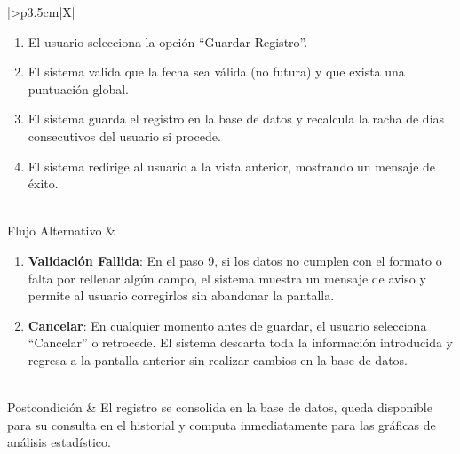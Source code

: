 \begin{xltabular}{\textwidth}{|>{\bfseries}p{3.5cm}|X|}
\begin{enumerate}[leftmargin=0.5cm, topsep=0pt, partopsep=0pt, parsep=0pt, itemsep=4pt]
        \item El usuario selecciona la opción ``Guardar Registro''.
        \item El sistema valida que la fecha sea válida (no futura) y que exista una puntuación global.
        \item El sistema guarda el registro en la base de datos y recalcula la racha de días consecutivos del usuario si procede.
        \item El sistema redirige al usuario a la vista anterior, mostrando un mensaje de éxito.
    \end{enumerate} 
    \\ \hline
    Flujo Alternativo & 
    \begin{enumerate}[leftmargin=0.5cm, topsep=0pt, partopsep=0pt, parsep=0pt, itemsep=4pt]
        \item \textbf{Validación Fallida}: En el paso 9, si los datos no cumplen con el formato o falta por rellenar algún campo, el sistema muestra un mensaje de aviso y permite al usuario corregirlos sin abandonar la pantalla.
        \item \textbf{Cancelar}: En cualquier momento antes de guardar, el usuario selecciona ``Cancelar'' o retrocede. El sistema descarta toda la información introducida y regresa a la pantalla anterior sin realizar cambios en la base de datos.
    \end{enumerate}
    \\ \hline
    Postcondición & El registro se consolida en la base de datos, queda disponible para su consulta en el historial y computa inmediatamente para las gráficas de análisis estadístico. \\ \hline

    \caption{CU6: Crear Registro Diario}
    \label{tab:esp_cu6} \\
\end{xltabular}
\endgroup


